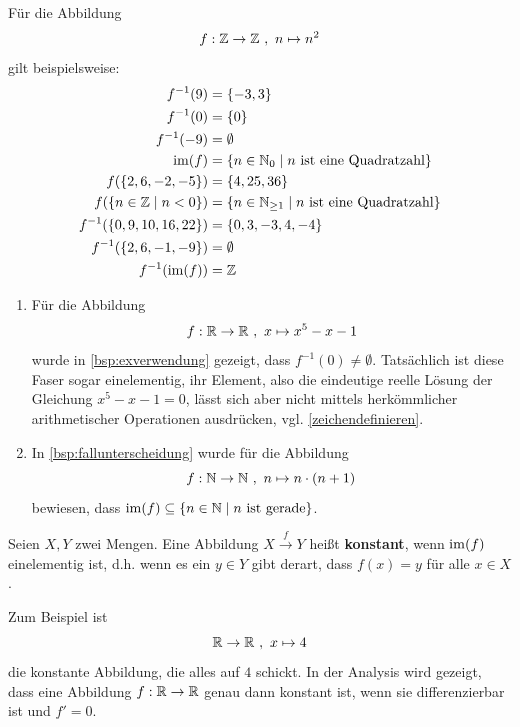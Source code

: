 \begin{bsp}
    Für die Abbildung
    \begin{align*}
        f: \mathbb Z \to \mathbb Z \ ,\ n \mapsto n^2
    \end{align*}
    gilt beispielsweise:
    \begin{align*}
        f^{-1}(9) & = \{-3,3\} \\
        f^{-1}(0) & = \{0\} \\
        f^{-1}(-9) & = \emptyset \\
        \im(f) & = \{n\in \N_0 \mid n\ \text{ist eine Quadratzahl} \} \\
        f( \{2,6,-2,-5\}) & = \{4,25,36\} \\
        f(\{n\in \Z \mid n < 0  \}) & = \{n\in \N_{\ge 1} \mid n\ \text{ist eine Quadratzahl} \} \\
        f^{-1}(\{0,9,10,16,22\}) & = \{0,3,-3,4,-4\} \\
        f^{-1}(\{2,6,-1,-9\}) & = \emptyset \\
        f^{-1}(\im(f)) & = \Z
    \end{align*}
\end{bsp}


\begin{bsp}[*] \quad
    \begin{enumerate}
        \item Für die Abbildung
            \[ f : \R \to \R \ ,\ x\mapsto x^5-x-1 \]
        wurde in \cref{bsp:exverwendung} gezeigt, dass $f^{-1}(0)\neq\emptyset$. Tatsächlich ist diese Faser sogar einelementig, ihr Element, also die eindeutige reelle Lösung der Gleichung $x^5-x-1=0$, lässt sich aber nicht mittels herkömmlicher arithmetischer Operationen ausdrücken, vgl. \cref{zeichendefinieren}.
        \item In \cref{bsp:fallunterscheidung} wurde für die Abbildung
            \[ f : \N \to \N \ ,\ n \mapsto n\cdot (n+1) \]
        bewiesen, dass $\operatorname{im}(f)\subseteq \{n\in \mathbb N\mid n\ \text{ist gerade}\}$.
    \end{enumerate}
\end{bsp}


\begin{de} 
Seien $X,Y$ zwei Mengen. Eine Abbildung $X\xrightarrow{f} Y$ heißt \textbf{konstant}, wenn $\operatorname{im}(f)$ einelementig ist, d.h. wenn es ein $y\in Y$ gibt derart, dass $f(x)=y$ für alle $x\in X$.
\end{de}


\begin{bsp}
Zum Beispiel ist
\[ \mathbb R \to \mathbb R \ ,\ x\mapsto 4 \]
die konstante Abbildung, die alles auf $4$ schickt. In der Analysis wird gezeigt, dass eine Abbildung $f : \mathbb R\to \mathbb R$ genau dann konstant ist, wenn sie differenzierbar ist und $f'=0$.
\end{bsp}





